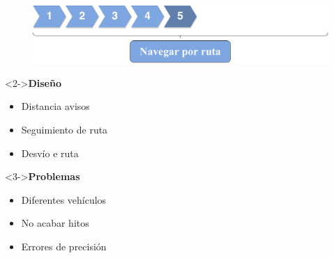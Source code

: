 \begin{slide}
  \begin{center}
    \begin{figure}[!h]
      \includegraphics[height=0.27\textheight]{img/ite5.png}
    \end{figure}
    \vspace{0.5cm}
    \begin{minipage}[b]{0.4\linewidth}
      \begin{block}<2->{\textbf{Diseño}}
        \begin{itemize}
          \item Distancia avisos
          \item Seguimiento de ruta
          \item Desvío e ruta
        \end{itemize}
      \end{block}
    \end{minipage}
    \hspace{0.5cm}
    \begin{minipage}[b]{0.4\linewidth}
      \begin{block}<3->{\textbf{Problemas}}
        \begin{itemize}
          \item Diferentes vehículos
          \item No acabar hitos
          \item Errores de precisión
        \end{itemize}
      \end{block}
    \end{minipage}
  \end{center}
\end{slide}


